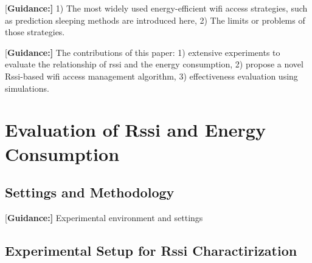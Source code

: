 \documentclass[journal]{IEEEtran}
\begin{document}
{[\bf Guidance:]}  1) The most widely used energy-efficient wifi access strategies, such as prediction sleeping methods are introduced here,  2) The limits or problems of those strategies.

{[\bf Guidance:]} The contributions of this paper: 1) extensive experiments to evaluate the relationship of rssi and the energy consumption, 2) propose a novel Rssi-based wifi access management algorithm, 3) effectiveness evaluation using simulations.


 

\section{Evaluation of Rssi and Energy Consumption}
\subsection{Settings and Methodology}
{[\bf Guidance:]} Experimental environment and settings

\subsection{Experimental Setup for Rssi Charactirization}
\end{document}
